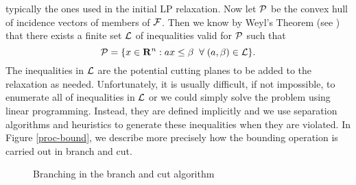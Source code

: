 typically the ones used in the initial LP relaxation. Now let ${\cal
P}$ be the convex hull of incidence vectors of members of ${\cal
F}$. Then we know by Weyl's Theorem (see \cite{N&W}) that there exists
a finite set ${\cal L}$ of inequalities valid for ${\cal P}$ such that
\begin{equation}
\label{the-polyhedron}
{\cal P} = \{x \in {\bf R}^n: ax \leq \beta\;\;\forall\;(a, \beta) \in 
{\cal L}\}.
\end{equation}
The inequalities in ${\cal L}$ are the potential cutting planes to be
added to the relaxation as needed. Unfortunately, it is usually
difficult, if not impossible, to enumerate all of inequalities in
${\cal L}$ or we could simply solve the problem using linear
programming. Instead, they are defined implicitly and we use
separation algorithms and heuristics to generate these inequalities
when they are violated. In Figure \ref{proc-bound}, we describe more
precisely how the bounding operation is carried out in branch and cut.
\begin{figure}
\caption{Branching in the branch and cut algorithm}
\label{branching-fig}
\end{figure}

